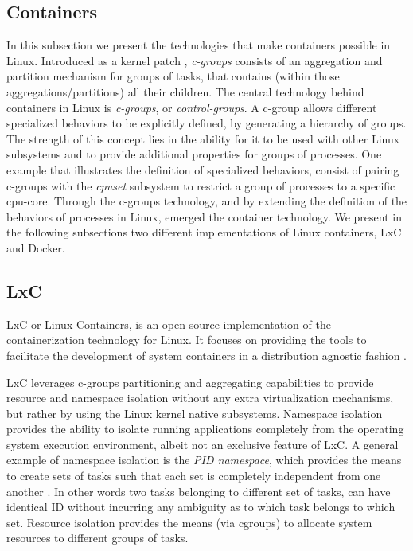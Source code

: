 \documentclass[12pt, titlepage]{uo_temp}
\begin{document}
     \subsection{Containers}\label{bkg_cgroup}
     In this subsection we present the technologies that make containers possible in
     Linux. Introduced as a kernel patch \cite{cgroups}, \emph{c-groups} consists of an
     aggregation and partition mechanism for groups of tasks, that contains (within those
     aggregations/partitions) all their children. The central technology behind containers
     in Linux is \emph{c-groups}, or \emph{control-groups}. A c-group allows different
     specialized behaviors to be explicitly defined, by generating a hierarchy of
     groups. The strength of this concept lies in the ability for it to be used with other
     Linux subsystems and to provide additional properties for groups of processes.  One
     example that illustrates the definition of specialized behaviors, consist of pairing
     c-groups with the \emph{cpuset} subsystem to restrict a group of processes to a
     specific \gls{cpu}-core. Through the c-groups technology, and by extending the
     definition of the behaviors of processes in Linux, emerged the container
     technology. We present in the following subsections two different implementations of
     Linux containers, LxC and Docker.

     \subsection{LxC}
     LxC or Linux Containers, is an open-source implementation of the containerization
     technology for Linux. It focuses on providing the tools to facilitate the development
     of system containers in a distribution agnostic fashion \cite{lxc}.

     LxC leverages c-groups partitioning and aggregating capabilities to provide resource
     and namespace isolation without any extra virtualization mechanisms, but rather
     by using the Linux kernel native subsystems. Namespace isolation provides the ability
     to isolate running applications completely from the operating system execution
     environment, albeit not an exclusive feature of LxC. A general example of namespace
     isolation is the \emph{PID namespace}, which provides the means to create sets of
     tasks such that each set is completely independent from one another
     \cite{emelyanov2007pid}. In other words two tasks belonging to different set of
     tasks, can have identical ID without incurring any ambiguity as to which task belongs
     to which set. Resource isolation provides the means (via cgroups) to allocate
     system resources to different groups of tasks.
\end{document}
